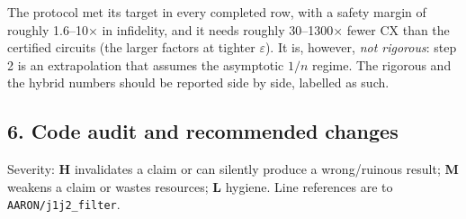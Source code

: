 \documentclass[
]{article}
\begin{document}
The protocol met its target in every completed row, with a safety margin
of roughly 1.6--10× in infidelity, and it needs roughly 30--1300× fewer
CX than the certified circuits (the larger factors at tighter
\(\varepsilon\)). It is, however, \emph{not rigorous}: step 2 is an
extrapolation that assumes the asymptotic \(1/n\) regime. The rigorous
and the hybrid numbers should be reported side by side, labelled as
such.

\hypertarget{code-audit-and-recommended-changes}{%
\subsection{6. Code audit and recommended
changes}\label{code-audit-and-recommended-changes}}

Severity: \textbf{H} invalidates a claim or can silently produce a
wrong/ruinous result; \textbf{M} weakens a claim or wastes resources;
\textbf{L} hygiene. Line references are to \texttt{AARON/j1j2\_filter}.
\end{document}
